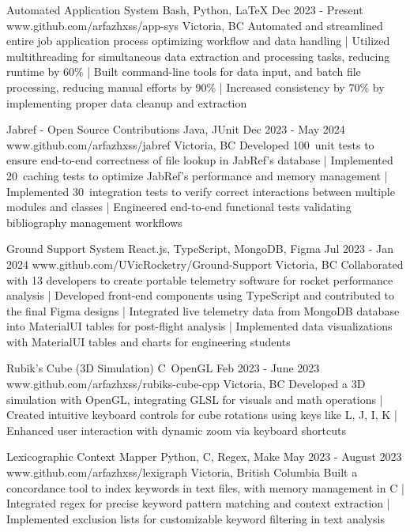 \documentclass[a4paper,10pt]{article}
\begin{document}
\projectentry
{Automated Application System}
{Bash, Python, LaTeX}
{Dec 2023 - Present}
{www.github.com/arfazhxss/app-sys}
{Victoria, BC}
{Automated and streamlined entire job application process optimizing workflow and data handling
| Utilized multithreading for simultaneous data extraction and processing tasks, reducing runtime by 60\% 
| Built command-line tools for data input, and batch file processing, reducing manual efforts by 90\% 
| Increased consistency by 70\% by implementing proper data cleanup and extraction
}

\projectentry
{Jabref - Open Source Contributions}
{Java, JUnit}
{Dec 2023 - May 2024}
{www.github.com/arfazhxss/jabref}
{Victoria, BC}
{Developed 100\plus\ unit tests to ensure end-to-end correctness of file lookup in JabRef's database
| Implemented 20\plus\ caching tests to optimize JabRef's performance and memory management
| Implemented 30\plus\ integration tests to verify correct interactions between multiple modules and classes
| Engineered end-to-end functional tests validating bibliography management workflows
}

\projectentry
{Ground Support System}
{React.js, TypeScript, MongoDB, Figma}
{Jul 2023 - Jan 2024}
{www.github.com/UVicRocketry/Ground-Support}
{Victoria, BC}
{Collaborated with 13 developers to create portable telemetry software for rocket performance analysis 
| Developed front-end components using TypeScript and contributed to the final Figma designs
| Integrated live telemetry data from MongoDB database into MaterialUI tables for post-flight analysis
| Implemented data visualizations with MaterialUI tables and charts for engineering students 
}

\projectentry
{Rubik's Cube (3D Simulation)}
{C\plus\plus\, OpenGL}
{Feb 2023 - June 2023}
{www.github.com/arfazhxss/rubiks-cube-cpp}
{Victoria, BC}
{Developed a 3D simulation with OpenGL, integrating GLSL for visuals and math operations 
| Created intuitive keyboard controls for cube rotations using keys like L, J, I, K 
| Enhanced user interaction with dynamic zoom via keyboard shortcuts
}

\projectentry
{Lexicographic Context Mapper}
{Python, C, Regex, Make}
{May 2023 - August 2023}
{www.github.com/arfazhxss/lexigraph}
{Victoria, British Columbia}
{Built a concordance tool to index keywords in text files, with memory management in C
| Integrated regex for precise keyword pattern matching and context extraction 
| Implemented exclusion lists for customizable keyword filtering in text analysis
}
\end{document}
